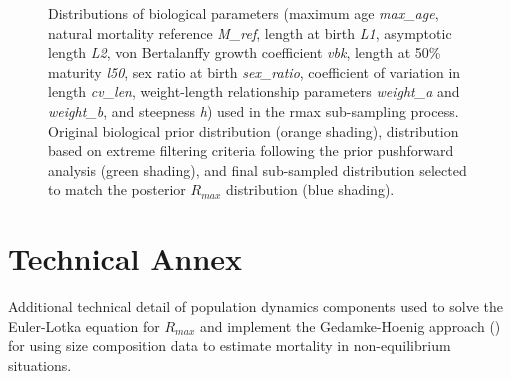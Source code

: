 \documentclass[
  11pt,
]{SCreport}
\begin{document}
\begin{figure}[H]


\caption{\label{fig-rmax-subsample-bio}Distributions of biological
parameters (maximum age \emph{max\_age}, natural mortality reference
\emph{M\_ref}, length at birth \emph{L1}, asymptotic length \emph{L2},
von Bertalanffy growth coefficient \emph{vbk}, length at 50\% maturity
\emph{l50}, sex ratio at birth \emph{sex\_ratio}, coefficient of
variation in length \emph{cv\_len}, weight-length relationship
parameters \emph{weight\_a} and \emph{weight\_b}, and steepness
\emph{h}) used in the rmax sub-sampling process. Original biological
prior distribution (orange shading), distribution based on extreme
filtering criteria following the prior pushforward analysis (green
shading), and final sub-sampled distribution selected to match the
posterior \(R_{max}\) distribution (blue shading).}

\end{figure}%

\newpage

\section{Technical Annex}\label{sec-tech-annex}

Additional technical detail of population dynamics components used to
solve the Euler-Lotka equation for \(R_{max}\) and implement the
Gedamke-Hoenig approach () for using size composition data to estimate mortality
in non-equilibrium situations.
\end{document}
